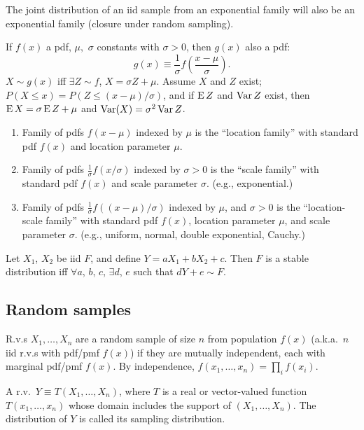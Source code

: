 \documentclass[8pt,letterpaper, landscape]{extarticle} %
\begin{document}
\begin{multicols}{3}
\begin{description}
The joint distribution of an iid sample from an exponential family will also be an exponential family (closure under random sampling).

 If $ f(x) $ a pdf, $ \mu, $ $ \sigma $ constants with $ \sigma > 0 $, then $ g(x) $ also a pdf: $$ g(x) \equiv \frac{1}{\sigma} f \left( \frac{x - \mu}{\sigma} \right). $$
$ X \sim g(x) $ iff $ \exists Z \sim f $, $ X = \sigma Z + \mu $. Assume $ X $ and $ Z $ exist; $ P (X \leq x) = P (Z \leq (x - \mu)/\sigma) $, and if $ \operatorname{E} Z $ and $ \operatorname{Var} Z  $ exist, then $ \operatorname{E} X = \sigma \operatorname{E} Z + \mu $ and $ \operatorname{Var} (X) = \sigma^2 \operatorname{Var} Z $. 
\begin{enumerate}
\item Family of pdfs $ f(x - \mu) $ indexed by $ \mu $ is the ``location family'' with standard pdf $ f(x) $ and location parameter $ \mu $.
\item Family of pdfs $ \frac{1}{\sigma} f(x / \sigma) $ indexed by $ \sigma > 0 $ is the ``scale family'' with standard pdf $ f(x) $ and scale parameter $ \sigma $. (e.g., exponential.)
\item Family of pdfs $ \frac{1}{\sigma} f((x - \mu) / \sigma) $ indexed by $ \mu $, and $ \sigma > 0 $ is the ``location-scale family'' with standard pdf $ f(x) $, location parameter $ \mu $, and scale parameter $ \sigma $. (e.g., uniform, normal, double exponential, Cauchy.)
\end{enumerate}

 Let $ X_1 $, $ X_2 $ be iid $ F $, and define $ Y = a X_1 + bX_2 + c $. Then $ F $ is a stable distribution iff $ \forall a $, $ b $, $ c $, $ \exists d $, $ e $ such that $ dY + e \sim F $.

\subsection{Random samples}
 R.v.s $ X_1, \dotsc, X_n $ are a random sample of size $ n $ from population $ f(x) $ (a.k.a.\ $ n $ iid r.v.s with pdf/pmf $ f(x) $) if they are mutually independent, each with marginal pdf/pmf $ f(x) $. By independence, $ f(x_1, \dotsc, x_n) = \prod_i f(x_i) $.

 A r.v.\ $ Y \equiv T (X_1, \dotsc, X_n) $, where $ T $ is a real or vector-valued function $ T(x_1, \dotsc, x_n) $ whose domain includes the support of $ (X_1, \dotsc, X_n) $. The distribution of $ Y $ is called its sampling distribution.


\end{description}
\end{multicols}
\end{document}
